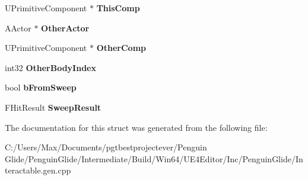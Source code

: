 \begin{DoxyCompactItemize}
\item 
\mbox{\label{struct_z___construct___u_function___a_interactable___on_comp_overlap___statics_1_1_interactable__event_on_comp_overlap___parms_a95d0117227a33627bb6025c9aba8bc0a}} 
U\+Primitive\+Component $\ast$ {\bfseries This\+Comp}
\item 
\mbox{\label{struct_z___construct___u_function___a_interactable___on_comp_overlap___statics_1_1_interactable__event_on_comp_overlap___parms_a47d22bc1c403db4b451d880461bab01e}} 
A\+Actor $\ast$ {\bfseries Other\+Actor}
\item 
\mbox{\label{struct_z___construct___u_function___a_interactable___on_comp_overlap___statics_1_1_interactable__event_on_comp_overlap___parms_aa0e2b423a7dc24f360f8f24d79aae943}} 
U\+Primitive\+Component $\ast$ {\bfseries Other\+Comp}
\item 
\mbox{\label{struct_z___construct___u_function___a_interactable___on_comp_overlap___statics_1_1_interactable__event_on_comp_overlap___parms_a97d7d26a3375facedc1666bee861f955}} 
int32 {\bfseries Other\+Body\+Index}
\item 
\mbox{\label{struct_z___construct___u_function___a_interactable___on_comp_overlap___statics_1_1_interactable__event_on_comp_overlap___parms_aeac7e4a52b5d71233409df9b468ae1d4}} 
bool {\bfseries b\+From\+Sweep}
\item 
\mbox{\label{struct_z___construct___u_function___a_interactable___on_comp_overlap___statics_1_1_interactable__event_on_comp_overlap___parms_a7830eae38c257586ad46b05253c2866a}} 
F\+Hit\+Result {\bfseries Sweep\+Result}
\end{DoxyCompactItemize}


The documentation for this struct was generated from the following file\+:\begin{DoxyCompactItemize}
\item 
C\+:/\+Users/\+Max/\+Documents/pgtbestprojectever/\+Penguin Glide/\+Penguin\+Glide/\+Intermediate/\+Build/\+Win64/\+U\+E4\+Editor/\+Inc/\+Penguin\+Glide/Interactable.\+gen.\+cpp\end{DoxyCompactItemize}
